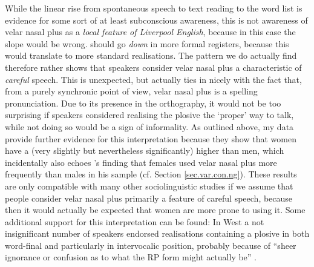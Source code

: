 While the linear rise from spontaneous speech to text reading to the word list is evidence for some sort of at least subconscious awareness, this is not awareness of velar nasal plus as a \emph{local feature of Liverpool English}, because in this case the slope would be wrong.
 should go \emph{down} in more formal registers, because this would translate to more standard realisations.
The pattern we do actually find therefore rather shows that speakers consider velar nasal plus a characteristic of \emph{careful} speech.
This is unexpected, but actually ties in nicely with the fact that, from a purely synchronic point of view, velar nasal plus is a spelling pronunciation.
Due to its presence in the orthography, it would not be too surprising if speakers considered realising the plosive the `proper' way to talk, while not doing so would be a sign of informality.
As outlined above, my data provide further evidence for this interpretation because they show that women have a (very slightly but nevertheless significantly) higher  than men, which incidentally also echoes \textcite{knowles1973}'s finding that females used velar nasal plus more frequently than males in his sample (cf. Section \ref{sec.var.con.ng}).
These results are only compatible with many other sociolinguistic studies if we assume that people consider velar nasal plus primarily a feature of careful speech, because then it would actually be expected that women are more prone to using it.
Some additional support for this interpretation can be found: In West  a not insignificant number of speakers endorsed realisations containing a plosive in both word-final and particularly in intervocalic position, probably because of ``sheer ignorance or confusion as to what the RP form might actually be'' \parencite[101]{newbrook1999}.

